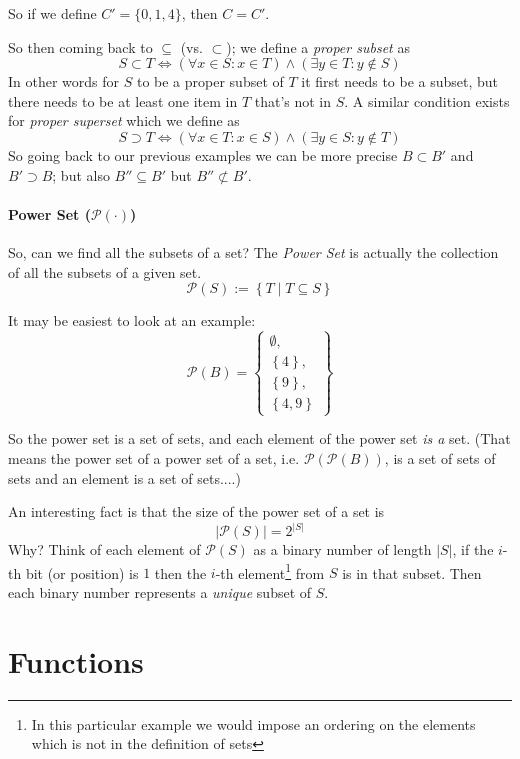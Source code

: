 So if we define $C' = \{0,1,4\}$, then $C=C'$.

So then coming back to $\subseteq$ (vs. $\subset$); 
we define a \emph{proper subset} as
\[
S \subset T \iff \left(\forall x \in S : x \in T\right) \wedge \left(\exists y \in T : y \notin S\right)
\]
In other words for $S$ to be a proper subset of $T$ it first needs to be a subset, but there needs to be at least one item in $T$ that's not in $S$.
A similar condition exists for \emph{proper superset} which we define as 
\[
S \supset T \iff \left(\forall x \in T : x \in S\right) \wedge \left(\exists y \in S : y \notin T\right)
\]
So going back to our previous examples we can be  more precise $B \subset B'$ and $B' \supset B$;
but also $B'' \subseteq B'$ but $B'' \not\subset B'$.

\paragraph{Power Set ($\mathcal{P}(\cdot)$)}

So, can we find all the subsets of a set?  
The \emph{Power Set} is actually the collection of all the subsets of a given set. 
\[
\mathcal{P}(S) := \left\{T \mid T \subseteq S\right\}
\]

It may be easiest to look at an example: 
\[
\mathcal{P}\left(B\right) = \left\{ \begin{matrix}\emptyset, \\ \left\{4\right\}, \\ \left\{9\right\}, \\\left\{4,9\right\}\end{matrix} \right\}
\]

So the power set is a set of sets, and each element of the power set \textit{is a} set.
(That means the power set of a power set of a set, i.e. $\mathcal{P}\left(\mathcal{P}\left(B\right)\right)$, is a set of sets of sets and an element is a set of sets....) 

An interesting fact is that the size of the power set of a set is 
\[
\left|\mathcal{P}\left(S\right)\right| = 2^{|S|}
\]
Why? Think of each element of $\mathcal{P}\left(S\right)$ as a binary number of length $|S|$, 
if the $i$-th bit (or position) is $1$ then the $i$-th element\footnote{In this particular example we would impose an ordering on the elements which is not in the definition of sets} from $S$ is in that subset. 
Then each binary number represents a \textit{unique} subset of $S$. 

\section{Functions}

